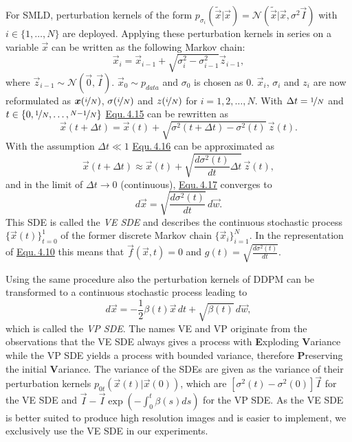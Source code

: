 For SMLD, perturbation kernels of the form $p_{\sigma_i}(\tilde{\vec{x}}|\vec{x})=\mathcal{N}(\tilde{\vec{x}}|\vec{x},\sigma^2\vec{I})$ with $i\in\{1,\dots,N\}$ are deployed. Applying these perturbation kernels in series on a variable $\vec{x}$ can be written as the following Markov chain:
%
\begin{equation} \label{equ:4.15}
    \vec{x}_i=\vec{x}_{i-1}+\sqrt{\sigma_i^2-\sigma_{i-1}^2}\vec{z}_{i-1},
\end{equation}
%
where $\vec{z}_{i-1}\sim\mathcal{N}(\vec{0},\vec{I})$. $\vec{x}_0\sim p_{data}$ and $\sigma_0$ is chosen as $0$. $\vec{x}_i$, $\sigma_i$ and $z_i$ are now reformulated as $\vec{x}(\nicefrac{i}{N})$, $\sigma(\nicefrac{i}{N})$ and $z(\nicefrac{i}{N})$ for $i=1,2,\dots,N$. With $\Delta t=\nicefrac{1}{N}$ and $t\in\{0,\nicefrac{1}{N},\dots,\nicefrac{N-1}{N}\}$ \hyperref[equ:4.15]{Equ.\,4.15} can be rewritten as
%
\begin{equation} \label{equ:4.16}
    \vec{x}(t+\Delta t)=\vec{x}(t)+\sqrt{\sigma^2(t+\Delta t)-\sigma^2(t)}\,\vec{z}(t).
\end{equation}
%
With the assumption $\Delta t \ll 1$ \hyperref[equ:4.16]{Equ.\,4.16} can be approximated as 
%
\begin{equation} \label{equ:4.17}
    \vec{x}(t+\Delta t)\approx\vec{x}(t)+\sqrt{\frac{d\sigma^2(t)}{dt}\Delta t}\,\vec{z}(t),
\end{equation}
%
and in the limit of $\Delta t\rightarrow 0$ (continuous), \hyperref[equ:4.17]{Equ.\,4.17} converges to 
%
\begin{equation} \label{equ:4.18}
    d\vec{x}=\sqrt{\frac{d\sigma^2(t)}{dt}}\,d\vec{w}.
\end{equation}
%
This SDE is called the \textit{VE SDE} and describes the continuous stochastic process $\{\vec{x}(t)\}_{t=0}^1$ of the former discrete Markov chain $\{\vec{x}_i\}_{i=1}^N$. In the representation of \hyperref[equ:4.10]{Equ.\,4.10} this means that $\vec{f}(\vec{x},t)=0$ and $g(t)=\sqrt{\frac{d\sigma^2(t)}{dt}}$.

Using the same procedure also the perturbation kernels of DDPM can be transformed to a continuous stochastic process leading to
%
\begin{equation} \label{equ:4.19}
    d\vec{x}=-\frac{1}{2}\beta(t)\vec{x}\,dt+\sqrt{\beta(t)}\,d\vec{w},
\end{equation}
%
which is called the \textit{VP SDE}. The names VE and VP originate from the observations that the VE SDE always gives a process with \textbf{E}xploding \textbf{V}ariance while the VP SDE yields a process with bounded variance, therefore \textbf{P}reserving the initial \textbf{V}ariance. The variance of the SDEs are given as the variance of their perturbation kernels $p_{0t}(\vec{x}(t)|\vec{x}(0))$, which are $[\sigma^2(t)-\sigma^2(0)]\vec{I}$ for the VE SDE and $\vec{I}-\vec{I}\exp\left(-\int_0^t\beta(s)ds\right)$ for the VP SDE. As the VE SDE is better suited to produce high resolution images \cite{score_3} and is easier to implement, we exclusively use the VE SDE in our experiments.

